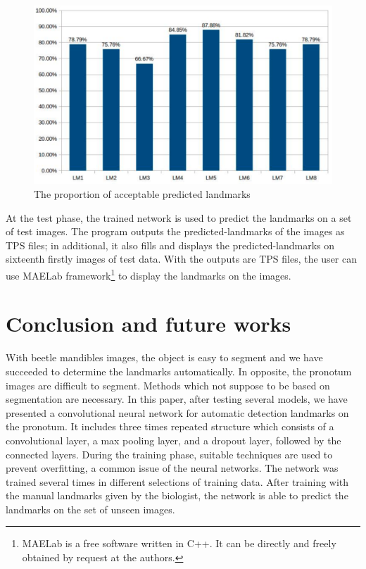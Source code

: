 \documentclass[review]{elsarticle}
\begin{document}
\begin{figure}[htbp]
	\centerline{\includegraphics[scale=0.2]{images/chart}}
	\caption{The proportion of acceptable predicted landmarks}
	\label{figchart}
\end{figure}

At the test phase, the trained network is used to predict the landmarks on a set of test images. The program outputs the predicted-landmarks of the images as TPS files; in additional, it also fills and displays the predicted-landmarks on sixteenth firstly images of test data. With the outputs are TPS files, the user can use MAELab \cite{le2017maelab} framework\footnote{MAELab is a free software written in C++. It can be directly
and freely obtained by request at the authors.} to display the landmarks on the images.
\section{Conclusion and future works}
With beetle mandibles images, the object is easy to segment and we have succeeded to determine the landmarks automatically. In opposite, the pronotum images are difficult to segment. Methods which not suppose to be based on segmentation are necessary. In this paper, after testing several models, we have presented a convolutional neural network for automatic detection landmarks on the pronotum. It includes three times repeated structure which consists of a convolutional layer, a max pooling layer, and a dropout layer, followed by the connected layers. During the training phase, suitable techniques are used to prevent overfitting, a common issue of the neural networks. The network was trained several times in different selections of training data. After training with the manual landmarks given by the biologist, the network is able to predict the landmarks on the set of unseen images.
\end{document}
